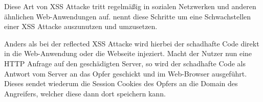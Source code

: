 Diese Art von XSS Attacke tritt regelmäßig in sozialen Netzwerken und anderen ähnlichen Web-Anwendungen auf. \textcite[2]{mahmoud2017} nennt diese Schritte um eine Schwachstellen einer XSS Attacke auszunutzen und umzusetzen.

Anders als bei der reflected XSS Attacke wird hierbei der schadhafte Code direkt in die Web-Anwendung oder die Webseite injeziert. Macht der Nutzer nun eine HTTP Anfrage auf den geschädigten Server, so wird der schadhafte Code als Antwort vom Server an das Opfer geschickt und im Web-Browser ausgeführt. Dieses sendet wiederum die Session Cookies des Opfers an die Domain des Angreifers, welcher diese dann dort speichern kann.